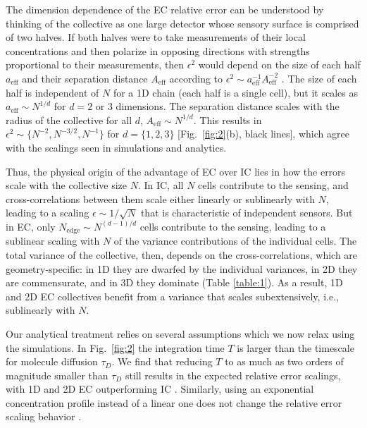 The dimension dependence of the EC relative error can be understood by thinking of the collective as one large detector whose sensory surface is comprised of two halves. If both halves were to take measurements of their local concentrations and then polarize in opposing directions with strengths proportional to their measurements, then $\epsilon^2$ would depend on the size of each half
$a_\text{eff}$
and their separation distance
$A_\text{eff}$ according to $\epsilon^2  \sim a^{-1}_\text{eff}A^{-2}_\text{eff}$ \cite{mugler2016limits}.
The size of each half is independent of $N$ for a 1D chain (each half is a single cell), but it scales as
$a_\text{eff} \sim N^{1/d}$ for $d = 2$ or $3$ dimensions.
The separation distance scales with the radius of the collective for all $d$,
$A_\text{eff} \sim N^{1/d}$. This results in
$\epsilon^2 \sim \{N^{-2}, N^{-3/2}, N^{-1}\}$ for $d=\{1,2,3\}$ [Fig.\ \ref{fig:2}(b), black lines],
which agree with the scalings seen in simulations and analytics.

Thus, the physical origin of the advantage of EC over IC lies in how the errors scale with the collective size $N$. In IC, all $N$ cells contribute to the sensing, and cross-correlations between them scale either linearly or sublinearly with $N$, leading to a scaling $\epsilon \sim 1/\sqrt{N}$ that is characteristic of independent sensors. But in EC, only $N_\text{edge} \sim N^{(d-1)/d}$ cells contribute to the sensing, leading to a sublinear scaling with $N$ of the variance contributions of the individual cells. The total variance of the collective, then, depends on the cross-correlations, which are geometry-specific: in 1D they are dwarfed by the individual variances, in 2D they are commensurate, and in 3D they dominate (Table \ref{table:1}). As a result, 1D and 2D EC collectives benefit from a variance that scales subextensively, i.e., sublinearly with $N$.

Our analytical treatment relies on several assumptions which we now relax using the simulations. In Fig.\ \ref{fig:2} the integration time $T$ is larger than the timescale for molecule diffusion $\tau_D$.
We find that reducing $T$ to as much as two orders of magnitude smaller than $\tau_D$ still results in the expected relative error scalings, with 1D and 2D EC outperforming IC \cite{supinfo}. Similarly, using an exponential concentration profile instead of a linear one does not change the relative error scaling behavior \cite{supinfo}.

